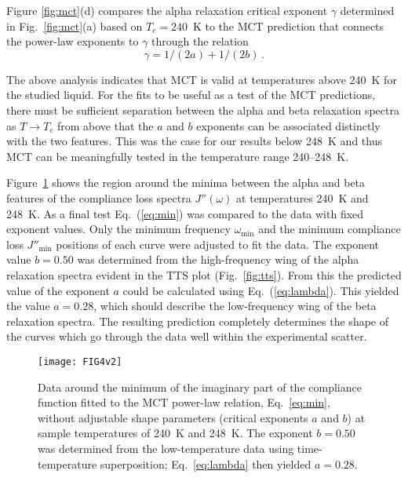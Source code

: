 \documentclass[reprint,showpacs,amsmath,amssymb,aip,jcp]{revtex4-1}
\begin{document}
Figure \ref{fig:mct}(d) compares the alpha relaxation critical
exponent $\gamma$ determined in Fig.~\ref{fig:mct}(a) based on
$T_c=240$~K to the MCT prediction that connects the power-law
exponents to $\gamma$ through the relation\cite{Gotze1992}
\begin{equation}\label{eq:gamma}
  \gamma =  1/(2a) + 1/(2b)\,.
\end{equation}

The above analysis indicates that MCT is valid at temperatures above
240~K for the studied liquid. For the fits to be useful as a test of
the MCT predictions, there must be sufficient separation between the
alpha and beta relaxation spectra as $T \rightarrow T_c$ from above
that the $a$ and $b$ exponents can be associated distinctly with the
two features\cite{Cummins1999,Gotze1999}. This was the case for our
results below 248~K and thus MCT can be meaningfully tested in the
temperature range 240--248~K.

Figure~\ref{fig:min} shows the region around the minima between the
alpha and beta features of the compliance loss spectra $J''(\omega)$
at temperatures 240~K and 248~K.  As a final test Eq.~(\ref{eq:min})
was compared to the data with fixed exponent values. Only the minimum
frequency $\omega_\text{min}$ and the minimum compliance loss
$J''_\text{min}$ positions of each curve were adjusted to fit the
data.  The exponent value $b = 0.50$ was determined from the
high-frequency wing of the alpha relaxation spectra evident in the TTS
plot (Fig.~\ref{fig:tts}). From this the predicted value of the
exponent $a$ could be calculated using Eq.~(\ref{eq:lambda}). This
yielded the value $a = 0.28$, which should describe the low-frequency
wing of the beta relaxation spectra. The resulting prediction
completely determines the shape of the curves which go through the
data well within the experimental scatter.

\begin{figure}
  \begin{center}
    \texttt{[image: FIG4v2]}
  \end{center}
  \caption{\label{fig:min}Data around the minimum of the imaginary
    part of the compliance function fitted to the MCT power-law
    relation, Eq.~\ref{eq:min}, without adjustable shape parameters
    (critical exponents $a$ and $b$) at sample temperatures of 240~K
    and 248~K. The exponent $b = 0.50$ was determined from the
    low-temperature data using time-temperature superposition;
    Eq.~\ref{eq:lambda} then yielded $a = 0.28$. }
\end{figure}
\end{document}
